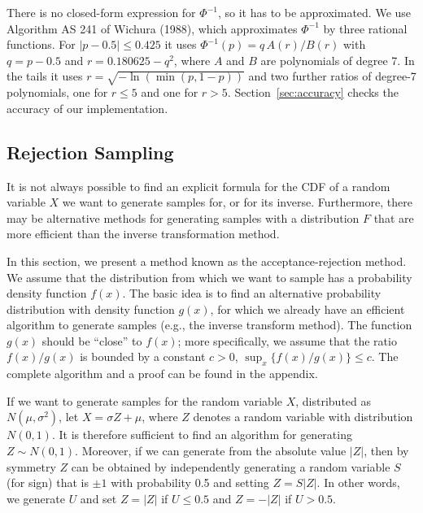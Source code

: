 \documentclass[12pt,a4paper]{article}
\begin{document}
There is no closed-form expression for $\Phi^{-1}$, so it has to be approximated. We use Algorithm AS 241 of Wichura (1988), which approximates $\Phi^{-1}$ by three rational functions. For $|p - 0.5| \le 0.425$ it uses $\Phi^{-1}(p) = q\,A(r)/B(r)$ with $q = p - 0.5$ and $r = 0.180625 - q^2$, where $A$ and $B$ are polynomials of degree 7. In the tails it uses $r = \sqrt{-\ln(\min(p, 1-p))}$ and two further ratios of degree-7 polynomials, one for $r \le 5$ and one for $r > 5$. Section~\ref{sec:accuracy} checks the accuracy of our implementation.

\subsection{Rejection Sampling}

It is not always possible to find an explicit formula for the CDF of a random variable $X$ we want to generate samples for, or for its inverse. Furthermore, there may be alternative methods for generating samples with a distribution $F$ that are more efficient than the inverse transformation method.

In this section, we present a method known as the acceptance-rejection method. We assume that the distribution from which we want to sample has a probability density function $f(x)$. The basic idea is to find an alternative probability distribution with density function $g(x)$, for which we already have an efficient algorithm to generate samples (e.g., the inverse transform method). The function $g(x)$ should be ``close'' to $f(x)$; more specifically, we assume that the ratio $f(x)/g(x)$ is bounded by a constant $c > 0$, $\sup_x \{f(x)/g(x)\} \le c$. The complete algorithm and a proof can be found in the appendix.

If we want to generate samples for the random variable $X$, distributed as $N(\mu,\sigma^2)$, let $X = \sigma Z + \mu$, where $Z$ denotes a random variable with distribution $N(0,1)$. It is therefore sufficient to find an algorithm for generating $Z \sim N(0,1)$. Moreover, if we can generate from the absolute value $|Z|$, then by symmetry $Z$ can be obtained by independently generating a random variable $S$ (for sign) that is $\pm 1$ with probability 0.5 and setting $Z = S|Z|$. In other words, we generate $U$ and set $Z = |Z|$ if $U \le 0.5$ and $Z = -|Z|$ if $U > 0.5$.
\end{document}
